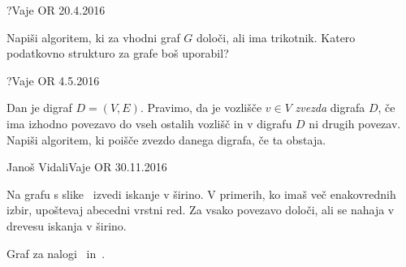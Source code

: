 \begin{naloga}{?}{Vaje OR 20.4.2016}
\begin{vprasanje}
Napiši algoritem, ki za vhodni graf $G$ določi, ali ima trikotnik.
Katero podatkovno strukturo za grafe boš uporabil?
\end{vprasanje}
\begin{odgovor}
\end{odgovor}
\end{naloga}


\begin{naloga}{?}{Vaje OR 4.5.2016}
\begin{vprasanje}
Dan je digraf $D = (V, E)$.
Pravimo, da je vozlišče $v \in V$ {\em zvezda} digrafa $D$,
če ima izhodno povezavo do vseh ostalih vozlišč
in v digrafu $D$ ni drugih povezav.
Napiši algoritem, ki poišče zvezdo danega digrafa, če ta obstaja.
\end{vprasanje}
\begin{odgovor}
\end{odgovor}
\end{naloga}


\begin{naloga}{Janoš Vidali}{Vaje OR 30.11.2016}
\begin{vprasanje}[bfs]
Na grafu s slike~\fig{} izvedi iskanje v širino.
V primerih, ko imaš več ena\-ko\-vred\-nih izbir,
upoštevaj abecedni vrstni red.
Za vsako povezavo določi, ali se nahaja v drevesu iskanja v širino.

\begin{slika}
\caption{Graf za nalogi~\nal{} in~.}
\end{slika}
\end{vprasanje}
\begin{odgovor}
\end{odgovor}
\end{naloga}


